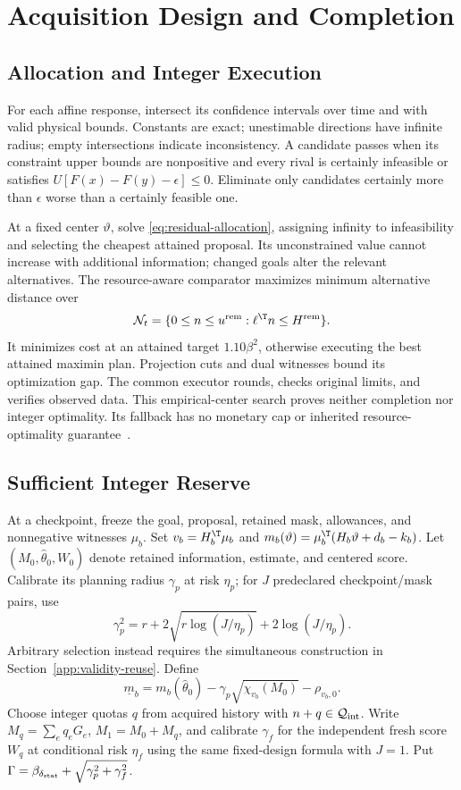 \section{Acquisition Design and Completion}
\label{app:acquisition-design}
\label{app:constructive-plan}
\label{app:supporting-constructions}
\subsection{Allocation and Integer Execution}
For each affine response, intersect its confidence intervals over time and with valid physical bounds. Constants are exact; unestimable directions have infinite radius; empty intersections indicate inconsistency. A candidate passes when its constraint upper bounds are nonpositive and every rival is certainly infeasible or satisfies $U[F(x)-F(y)-\epsilon]\leq0$. Eliminate only candidates certainly more than $\epsilon$ worse than a certainly feasible one.

At a fixed center $\vartheta$, solve \eqref{eq:residual-allocation}, assigning infinity to infeasibility and selecting the cheapest attained proposal. Its unconstrained value cannot increase with additional information; changed goals alter the relevant alternatives.
The resource-aware comparator maximizes minimum alternative distance over
$$\mathcal N_t=\{0\leq n\leq u^{\rm rem}:\ell^\T n\leq H^{\rm rem}\}.$$
It minimizes cost at an attained target $1.10\beta^2$, otherwise executing the best attained maximin plan. Projection cuts and dual witnesses bound its optimization gap. The common executor rounds, checks original limits, and verifies observed data. This empirical-center search proves neither completion nor integer optimality. Its fallback has no monetary cap or inherited resource-optimality guarantee~\cite{li2024}.

\subsection{Sufficient Integer Reserve}
\label{app:old-sufficient-plan}
At a checkpoint, freeze the goal, proposal, retained mask, allowances, and nonnegative witnesses $\mu_b$. Set $v_b=H_b^\T\mu_b$ and $m_b(\vartheta)=\mu_b^\T(H_b\vartheta+d_b-k_b)$. Let $(M_0,\widehat\theta_0,W_0)$ denote retained information, estimate, and centered score. Calibrate its planning radius $\gamma_p$ at risk $\eta_p$; for $J$ predeclared checkpoint/mask pairs, use
$$\gamma_p^2=r+2\sqrt{r\log(J/\eta_p)}+2\log(J/\eta_p).$$
Arbitrary selection instead requires the simultaneous construction in Section~\ref{app:validity-reuse}. Define
\begin{equation}
\underline m_b=m_b(\widehat\theta_0)
-\gamma_p\sqrt{\chi_{v_b}(M_0)}-\rho_{v_b,0}.
\label{eq:planning-margin}
\end{equation}
Choose integer quotas $q$ from acquired history with $n+q\in\mathcal Q_{\rm int}$. Write $M_q=\sum_eq_eG_e$, $M_1=M_0+M_q$, and calibrate $\gamma_f$ for the independent fresh score $W_q$ at conditional risk $\eta_f$ using the same fixed-design formula with $J=1$. Put $\Gamma=\beta_{\delta_{\rm stat}}+\sqrt{\gamma_p^2+\gamma_f^2}$.

